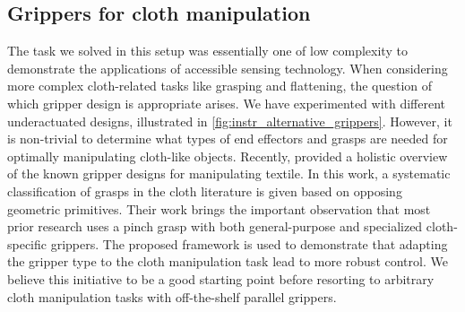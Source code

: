 \documentclass[\home/main.tex]{subfiles}
\begin{document}
\subsection{Grippers for cloth manipulation}
The task we solved in this setup was essentially one of low complexity to demonstrate the applications of accessible sensing technology. When considering more complex cloth-related tasks like grasping and flattening, the question of which gripper design is appropriate arises. We have experimented with different underactuated designs, illustrated in \cref{fig:instr_alternative_grippers}. However, it is non-trivial to determine what types of end effectors and grasps are needed for optimally manipulating cloth-like objects.
Recently, \textcite{Borras2020} provided a holistic overview of the known gripper designs for manipulating textile.
In this work, a systematic classification of grasps in the cloth literature is given based on opposing geometric primitives.
Their work brings the important observation that most prior research uses a pinch grasp with both general-purpose and specialized cloth-specific grippers.
The proposed framework is used to demonstrate that adapting the gripper type to the cloth manipulation task lead to more robust control. We believe this initiative to be a good starting point before resorting to arbitrary cloth manipulation tasks with off-the-shelf parallel grippers.

\newcommand\gripperPicHeight{0.22\textheight}
\end{document}
